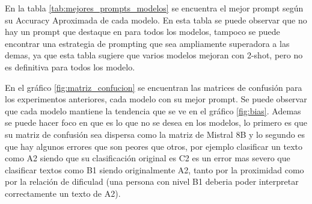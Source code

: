 En la tabla \ref{tab:mejores_prompts_modelos} se encuentra el mejor prompt según su Accuracy Aproximada de cada modelo. En esta tabla se puede observar que no hay un prompt que destaque en para todos los modelos, tampoco se puede encontrar una estrategia de prompting que sea ampliamente superadora a las demas, ya que esta tabla sugiere que varios modelos mejoran con 2-shot, pero no es definitiva para todos los modelo.

En el gráfico \ref{fig:matriz_confucion} se encuentran las matrices de confusión para los experimentos anteriores, cada modelo con su mejor prompt. Se puede observar que cada modelo mantiene la tendencia que se ve en el gráfico \ref{fig:bias}. Ademas se puede hacer foco en que es lo que no se desea en los modelos, lo primero es que su matriz de confusión sea dispersa como la matriz de Mistral 8B y lo segundo es que hay algunos errores que son peores que otros, por ejemplo clasificar un texto como A2 siendo que su clasificación original es C2 es un error mas severo que clasificar textos como B1 siendo originalmente A2, tanto por la proximidad como por la relación de dificulad (una persona con nivel B1 deberia poder interpretar correctamente un texto de A2).

\begin{table}[H]
\centering
{}
\caption{Mejor prompt para cada modelo según la Accuracy Aproximada, para la partición de holdout.}
\label{tab:mejores_prompts_modelos}
\end{table}

